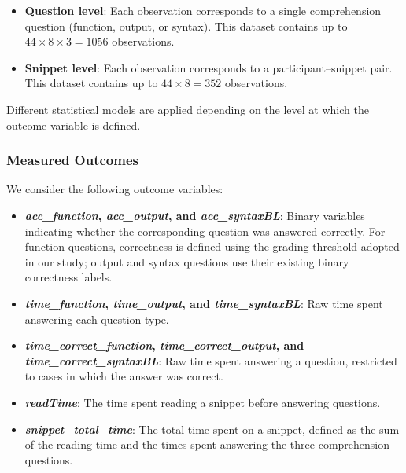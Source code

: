 \begin{itemize}

\item \textbf{Question level}: Each observation corresponds to a single comprehension question (function, output, or syntax). This dataset contains up to $44 \times 8 \times 3 = 1056$ observations.

\item \textbf{Snippet level}: Each observation corresponds to a participant--snippet pair. This dataset contains up to $44 \times 8 = 352$ observations.

\end{itemize}

Different statistical models are applied depending on the level at which the outcome variable is defined.

\subsubsection{Measured Outcomes}

We consider the following outcome variables:

\begin{itemize}

\item \textbf{\emph{acc\_function}, \emph{acc\_output}, and \emph{acc\_syntaxBL}}: Binary variables indicating whether the corresponding question was answered correctly. For function questions, correctness is defined using the grading threshold adopted in our study; output and syntax questions use their existing binary correctness labels.

\item \textbf{\emph{time\_function}, \emph{time\_output}, and \emph{time\_syntaxBL}}: Raw time spent answering each question type.

\item \textbf{\emph{time\_correct\_function}, \emph{time\_correct\_output}, and\\
\emph{time\_correct\_syntaxBL}}: Raw time spent answering a question, restricted to cases in which the answer was correct.

\item \textbf{\emph{readTime}}: The time spent reading a snippet before answering questions.

\item \textbf{\emph{snippet\_total\_time}}: The total time spent on a snippet, defined as the sum of the reading time and the times spent answering the three comprehension questions.

\end{itemize}

